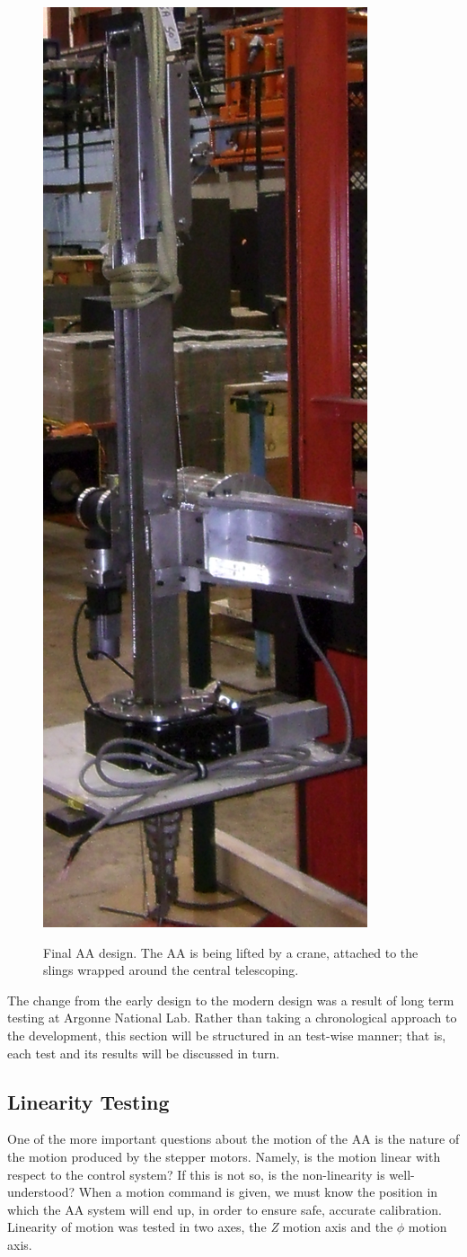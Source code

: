 \begin{figure}
\caption{Final AA design. The AA is being lifted by a crane, attached to the slings wrapped around the central telescoping.}
\includegraphics[width=.5 \textwidth]{AA/AA_Final.jpg}
\label{Recent_AA}
\end{figure}

The change from the early design to the modern design was a result of long term testing at Argonne National Lab. Rather than taking a chronological approach to the development, this section will be structured in an test-wise manner; that is, each test and its results will be discussed in turn. 


\subsection{Linearity Testing}
One of the more important questions about the motion of the AA is the nature of the motion produced by the stepper motors. Namely, is the motion linear with respect to the control system? If this is not so, is the non-linearity is well-understood? When a motion command is given, we must know the position in which the AA system will end up, in order to ensure safe, accurate calibration.  Linearity of motion was tested in two axes, the \emph{Z} motion axis and the $\phi$ motion axis. 


